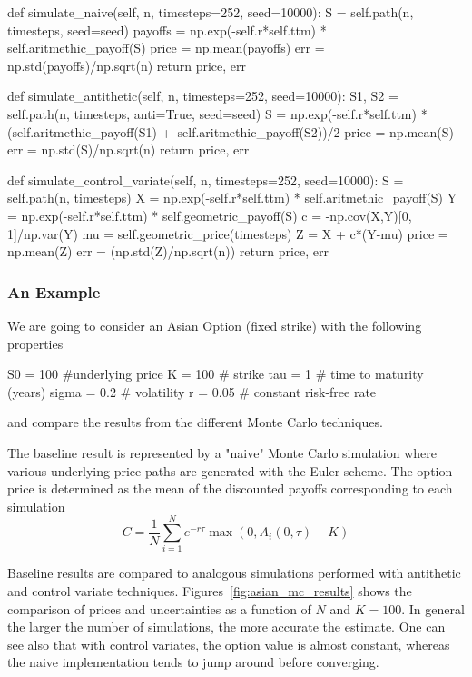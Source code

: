 \begin{ipython}
    def simulate_naive(self, n, timesteps=252, seed=10000):
        S = self.path(n, timesteps, seed=seed)
        payoffs = np.exp(-self.r*self.ttm) * self.aritmethic_payoff(S)
        price = np.mean(payoffs)
        err = np.std(payoffs)/np.sqrt(n)
        return price, err

    def simulate_antithetic(self, n, timesteps=252, seed=10000):
        S1, S2 = self.path(n, timesteps, anti=True, seed=seed)
        S = np.exp(-self.r*self.ttm) * (self.aritmethic_payoff(S1) +\
            self.aritmethic_payoff(S2))/2
        price = np.mean(S)
        err = np.std(S)/np.sqrt(n)
        return price, err
    
    def simulate_control_variate(self, n, timesteps=252, seed=10000):
        S = self.path(n, timesteps)
        X = np.exp(-self.r*self.ttm) * self.aritmethic_payoff(S)
        Y = np.exp(-self.r*self.ttm) * self.geometric_payoff(S)
        c = -np.cov(X,Y)[0, 1]/np.var(Y)
        mu = self.geometric_price(timesteps)
        Z = X + c*(Y-mu)
        price = np.mean(Z)
        err = (np.std(Z)/np.sqrt(n))
        return price, err
\end{ipython}

\subsubsection{An Example}
We are going to consider an Asian Option (fixed strike) with the following properties
\begin{ipython}
S0 = 100 #underlying price
K = 100 # strike
tau = 1 # time to maturity (years)
sigma = 0.2 # volatility
r = 0.05 # constant risk-free rate
\end{ipython}
and compare the results from the different Monte Carlo techniques.

The baseline result is represented by a "naive" Monte Carlo simulation where various underlying price paths are generated with the Euler scheme. The option price is determined as the mean of the discounted payoffs corresponding to each simulation
\begin{equation*}
C = \frac{1}{N}\sum_{i=1}^{N} e^{-r\tau}\max(0, A_i(0, \tau)-K)
\end{equation*}

Baseline results are compared to analogous simulations performed with antithetic and control variate techniques.
Figures~\ref{fig:asian_mc_results} shows the comparison of prices and uncertainties as a function of $N$ and $K=100$.
In general the larger the number of simulations, the more accurate the estimate.
One can see also that with control variates, the option value is almost constant, whereas the naive implementation tends to jump around before converging.

